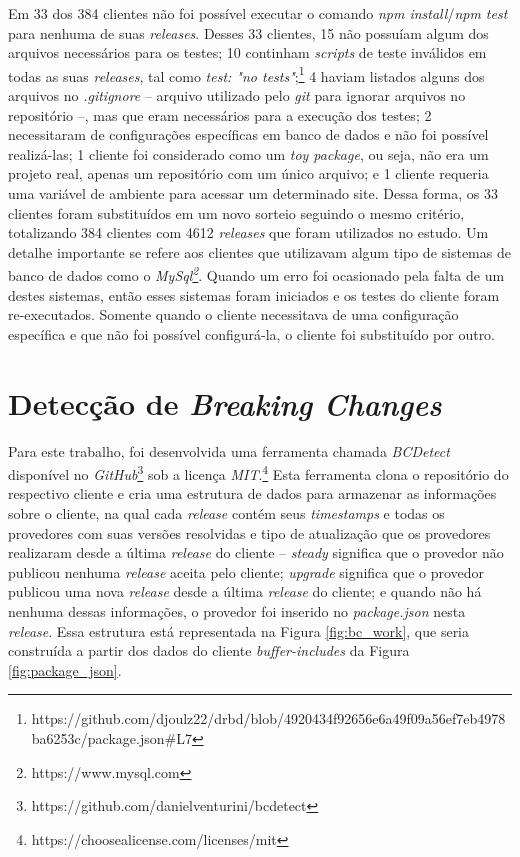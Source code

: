 Em 33 dos 384 clientes não foi possível executar o comando \textit{npm install}/\textit{npm test} para nenhuma de suas \textit{releases}. Desses 33 clientes, 15 não possuíam algum dos arquivos necessários para os testes; 10 continham \textit{scripts} de teste inválidos em todas as suas \textit{releases}, tal como \textit{test: "no tests"};\footnote{https://github.com/djoulz22/drbd/blob/4920434f92656e6a49f09a56ef7eb4978ba6253c/package.json\#L7} 4 haviam listados alguns dos arquivos no \textit{.gitignore} -- arquivo utilizado pelo \textit{git} para ignorar arquivos no repositório --, mas que eram necessários para a execução dos testes; 2 necessitaram de configurações específicas em banco de dados e não foi possível realizá-las; 1 cliente foi considerado como um \textit{toy package}, ou seja, não era um projeto real, apenas um repositório com um único arquivo; e 1 cliente requeria uma variável de ambiente para acessar um determinado site. Dessa forma, os 33 clientes foram substituídos em um novo sorteio seguindo o mesmo critério, totalizando 384 clientes com 4612 \textit{releases} que foram utilizados no estudo. Um detalhe importante se refere aos clientes que utilizavam algum tipo de sistemas de banco de dados como o \textit{MySql\footnote{https://www.mysql.com}}. Quando um erro foi ocasionado pela falta de um destes sistemas, então esses sistemas foram iniciados e os testes do cliente foram re-executados. Somente quando o cliente necessitava de uma configuração específica e que não foi possível configurá-la, o cliente foi substituído por outro.

\section{Detecção de \textit{Breaking Changes}}
\label{sec:bcdetect}
Para este trabalho, foi desenvolvida uma ferramenta chamada \textit{BCDetect} disponível no \textit{GitHub}\footnote{https://github.com/danielventurini/bcdetect} sob a licença \textit{MIT}.\footnote{https://choosealicense.com/licenses/mit} Esta ferramenta clona o repositório do respectivo cliente e cria uma estrutura de dados para armazenar as informações sobre o cliente, na qual cada \textit{release} contém seus \textit{timestamps} e todas os provedores com suas versões resolvidas e tipo de atualização que os provedores realizaram desde a última \textit{release} do cliente -- \textit{steady} significa que o provedor não publicou nenhuma \textit{release} aceita pelo cliente; \textit{upgrade} significa que o provedor publicou uma nova \textit{release} desde a última \textit{release} do cliente; e quando não há nenhuma dessas informações, o provedor foi inserido no \textit{package.json} nesta \textit{release}. Essa estrutura está representada na Figura \ref{fig:bc_work}, que seria construída a partir dos dados do cliente \textit{buffer-includes} da Figura \ref{fig:package_json}.

